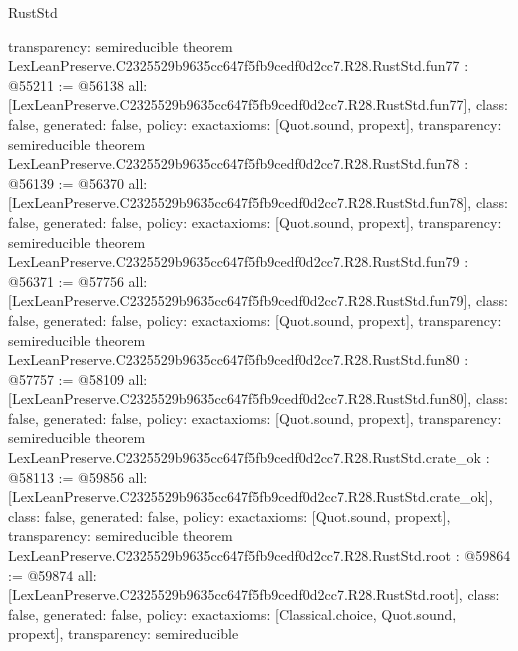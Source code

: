 \begin{lexlean}{RustStd}
\begin{coremodule}
{  transparency: semireducible
}
theorem LexLeanPreserve.C2325529b9635cc647f5fb9cedf0d2cc7.R28.RustStd.fun77 : @55211 := @56138 {
  all: [LexLeanPreserve.C2325529b9635cc647f5fb9cedf0d2cc7.R28.RustStd.fun77],
  class: false,
  generated: false,
  policy: exact{axioms: [Quot.sound, propext]},
  transparency: semireducible
}
theorem LexLeanPreserve.C2325529b9635cc647f5fb9cedf0d2cc7.R28.RustStd.fun78 : @56139 := @56370 {
  all: [LexLeanPreserve.C2325529b9635cc647f5fb9cedf0d2cc7.R28.RustStd.fun78],
  class: false,
  generated: false,
  policy: exact{axioms: [Quot.sound, propext]},
  transparency: semireducible
}
theorem LexLeanPreserve.C2325529b9635cc647f5fb9cedf0d2cc7.R28.RustStd.fun79 : @56371 := @57756 {
  all: [LexLeanPreserve.C2325529b9635cc647f5fb9cedf0d2cc7.R28.RustStd.fun79],
  class: false,
  generated: false,
  policy: exact{axioms: [Quot.sound, propext]},
  transparency: semireducible
}
theorem LexLeanPreserve.C2325529b9635cc647f5fb9cedf0d2cc7.R28.RustStd.fun80 : @57757 := @58109 {
  all: [LexLeanPreserve.C2325529b9635cc647f5fb9cedf0d2cc7.R28.RustStd.fun80],
  class: false,
  generated: false,
  policy: exact{axioms: [Quot.sound, propext]},
  transparency: semireducible
}
theorem LexLeanPreserve.C2325529b9635cc647f5fb9cedf0d2cc7.R28.RustStd.crate_ok : @58113 := @59856 {
  all: [LexLeanPreserve.C2325529b9635cc647f5fb9cedf0d2cc7.R28.RustStd.crate_ok],
  class: false,
  generated: false,
  policy: exact{axioms: [Quot.sound, propext]},
  transparency: semireducible
}
theorem LexLeanPreserve.C2325529b9635cc647f5fb9cedf0d2cc7.R28.RustStd.root : @59864 := @59874 {
  all: [LexLeanPreserve.C2325529b9635cc647f5fb9cedf0d2cc7.R28.RustStd.root],
  class: false,
  generated: false,
  policy: exact{axioms: [Classical.choice, Quot.sound, propext]},
  transparency: semireducible
}


\end{coremodule}
\end{lexlean}
